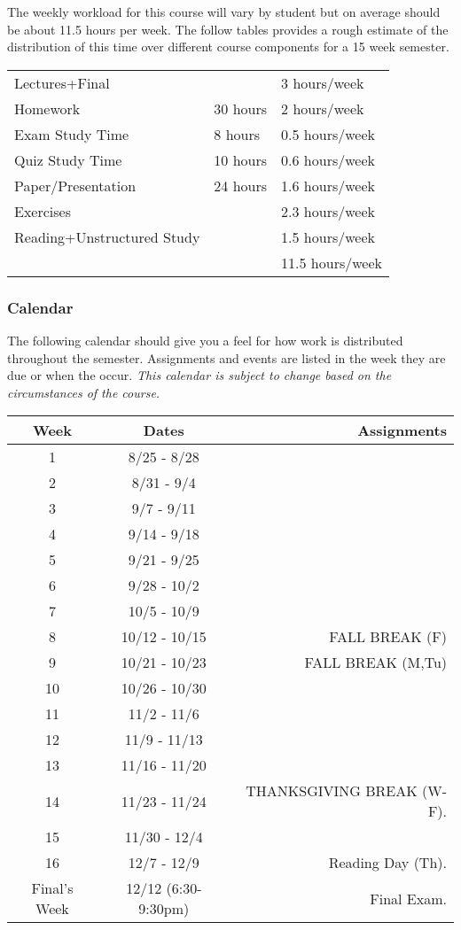 \documentclass[10pt]{article}
\begin{document}
The weekly workload for this course will vary by student but on average should be about 11.5 hours per week.  The follow tables provides a rough estimate of the distribution of this time over different course components for a 15 week semester. 
\begin{center}
\begin{tabular}{|l|l|l|}
\hline
Lectures+Final &           & 3 hours/week \\ 
Homework & 30 hours        & 2 hours/week \\
Exam Study Time & 8 hours  & 0.5 hours/week \\ 
Quiz Study Time & 10 hours & 0.6 hours/week \\
Paper/Presentation & 24 hours & 1.6 hours/week \\
Exercises &                & 2.3 hours/week \\
Reading+Unstructured Study & & 1.5 hours/week \\
\hline
& & 11.5 hours/week \\ 
\hline
\end{tabular}
\end{center}


\subsubsection{Calendar}

The following calendar should give you a feel for how work is distributed throughout the semester.  Assignments and events are listed in the week they are due or when the occur. \textit{This calendar is subject to change based on the circumstances of the course.}

\begin{center}
\begin{tabular}{|c|c|r|}
\hline 
Week & Dates & Assignments \\
\hline
1 & 8/25 - 8/28 &  \\
\hline 
2 & 8/31 - 9/4 &   \\
\hline
3 & 9/7 - 9/11 &   \\
\hline
4 & 9/14 - 9/18 &   \\
\hline
5 & 9/21 - 9/25 &  \\
\hline
6 & 9/28 - 10/2 & \\
\hline
7 & 10/5 - 10/9  &  \\
\hline 
8 & 10/12 - 10/15 &  FALL BREAK (F) \\
\hline
9 & 10/21 - 10/23 & FALL BREAK (M,Tu) \\
\hline
10 & 10/26 - 10/30 &  \\
\hline
11 & 11/2 - 11/6 & \\
\hline
12 & 11/9 - 11/13 &  \\
\hline
13 & 11/16 - 11/20 & \\
\hline
14 & 11/23 - 11/24 &  THANKSGIVING BREAK (W-F).   \\
\hline
15 & 11/30 - 12/4 & \\ 
\hline
16 & 12/7 - 12/9 &   Reading Day (Th). \\
\hline
Final's Week & 12/12 (6:30-9:30pm) & Final Exam. \\ 
\hline
\end{tabular}
\end{center}
\end{document}
